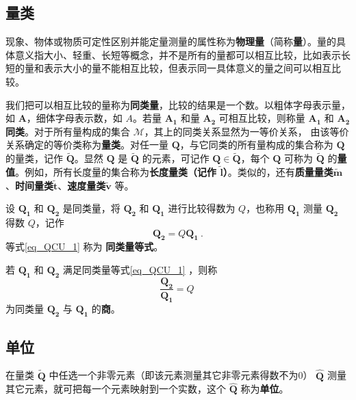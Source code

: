 \subsection{量类}
现象、物体或物质可定性区别并能定量测量的属性称为\textbf{物理量}（简称\textbf{量}）。量的具体意义指大小、轻重、长短等概念，并不是所有的量都可以相互比较，比如表示长短的量和表示大小的量不能相互比较，但表示同一具体意义的量之间可以相互比较。

我们把可以相互比较的量称为\textbf{同类量}，比较的结果是一个数。以粗体字母表示量，如 $\boldsymbol{A}$，细体字母表示数，如 $A$。若量 $\boldsymbol{A_1}$ 和量 $\boldsymbol{A_2}$ 可相互比较，则称量 $\boldsymbol{A_1}$ 和 $\boldsymbol{A_2}$ \textbf{同类}。对于所有量构成的集合 $\mathcal{M}$，其上的同类关系显然为一等价关系， 由该等价关系确定的等价类称为\textbf{量类}。对任一量 $\boldsymbol{Q}$，与它同类的所有量构成的集合称为 $\boldsymbol{Q}$ 的量类，记作 $\tilde{\boldsymbol{Q}}$。显然 $\boldsymbol{Q}$ 是 $\tilde{\boldsymbol{Q}}$ 的元素，可记作 $\boldsymbol{Q}\in \tilde{\boldsymbol{Q}}$，每个 $\boldsymbol{Q}$ 可称为 $\tilde{\boldsymbol{Q}}$ 的\textbf{量值}。例如，所有长度量的集合称为\textbf{长度量类（记作 $\tilde{\boldsymbol{l}}$）}。类似的，还有\textbf{质量量类}$\tilde{\boldsymbol{m}}$、\textbf{时间量类}$\tilde{\boldsymbol{t}}$、\textbf{速度量类}$\tilde{\boldsymbol{v}}$ 等。

设 $\boldsymbol{Q_1}$ 和 $\boldsymbol{Q_2}$ 是同类量，将 $\boldsymbol{Q_2}$ 和 $\boldsymbol{Q_1}$ 进行比较得数为 $Q$，也称用 $\boldsymbol{Q_1}$ 测量 $\boldsymbol{Q_2}$ 得数 $Q$，记作
\begin{equation}\label{eq_QCU_1}
\boldsymbol{Q_2}=Q\boldsymbol{Q_1}~.
\end{equation}
等式\autoref{eq_QCU_1} 称为 \textbf{同类量等式}。
\begin{definition}{}
若 $\boldsymbol{Q_1}$ 和 $\boldsymbol{Q_2}$ 满足同类量等式\autoref{eq_QCU_1} ，则称
\begin{equation}\label{eq_QCU_4}
\frac{\boldsymbol{Q_2}}{\boldsymbol{Q_1}}=Q~
\end{equation}
为同类量 $\boldsymbol{Q_2}$ 与 $\boldsymbol{Q_1}$ 的\textbf{商}。
\end{definition}
\subsection{单位}
在量类 $\tilde{\boldsymbol{Q}}$ 中任选一个非零元素（即该元素测量其它非零元素得数不为0） $\hat{\boldsymbol{Q}}$ 测量其它元素，就可把每一个元素映射到一个实数，这个 $\hat{\boldsymbol{Q}}$ 称为\textbf{单位}。

